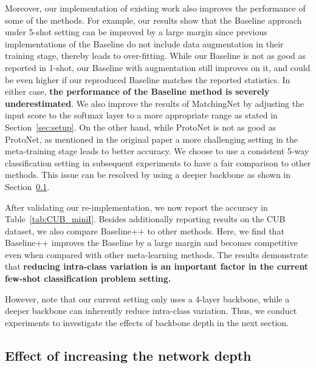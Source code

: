 \documentclass{article}
\newlength\secmargin
\newcommand{\secref}[1]{Section~\ref{sec:#1}}
\newcommand{\tabref}[1]{Table~\ref{tab:#1}}
\newcommand{\tb}[1]{\textbf{#1}}
\begin{document}
Moreover, our implementation of existing work also improves the performance of some of the methods. For example, our results show that the Baseline approach under 5-shot setting can be improved by a large margin since previous implementations of the Baseline do not include data augmentation in their training stage, thereby leads to over-fitting. While our Baseline is not as good as reported in 1-shot, our Baseline with augmentation still improves on it, and could be even higher if our reproduced Baseline matches the reported statistics. In either case, \tb{the performance of the Baseline method is severely underestimated}. We also improve the results of MatchingNet by adjusting the input score to the softmax layer to a more appropriate range as stated in \secref{setup}. On the other hand, while ProtoNet is not as good as ProtoNet, as mentioned in the original paper a more challenging setting in the meta-training stage leads to better accuracy.  We choose to use a consistent 5-way classification setting in subsequent experiments to have a fair comparison to other methods. This issue can be resolved by using a deeper backbone as shown in \secref{backbone}.

After validating our re-implementation, we now report the accuracy in \tabref{CUB_miniI}. Besides additionally reporting results on the CUB dataset, we also compare Baseline++ to other methods. Here, we find that Baseline++ improves the Baseline by a large margin and becomes competitive even when compared with other meta-learning methods. The results demonstrate that \tb{reducing intra-class variation is an important factor in the current few-shot classification problem setting.}

However, note that our current setting only uses a 4-layer backbone, while a deeper backbone can inherently reduce intra-class variation. Thus, we conduct experiments to investigate the effects of backbone depth in the next section.

\vspace{\secmargin}
\subsection{Effect of increasing the network depth}
\label{sec:backbone}
\end{document}
